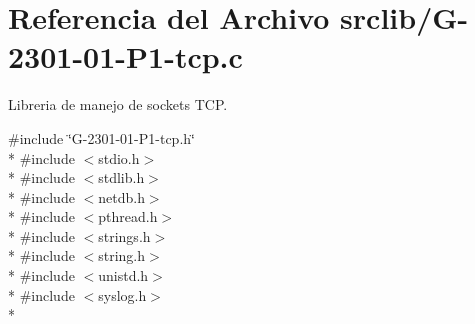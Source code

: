 \hypertarget{G-2301-01-P1-tcp_8c}{}\section{Referencia del Archivo srclib/\+G-\/2301-\/01-\/\+P1-\/tcp.c}
\label{G-2301-01-P1-tcp_8c}


Libreria de manejo de sockets T\+C\+P.  


{\ttfamily \#include \char`\"{}G-\/2301-\/01-\/\+P1-\/tcp.\+h\char`\"{}}\\*
{\ttfamily \#include $<$stdio.\+h$>$}\\*
{\ttfamily \#include $<$stdlib.\+h$>$}\\*
{\ttfamily \#include $<$netdb.\+h$>$}\\*
{\ttfamily \#include $<$pthread.\+h$>$}\\*
{\ttfamily \#include $<$strings.\+h$>$}\\*
{\ttfamily \#include $<$string.\+h$>$}\\*
{\ttfamily \#include $<$unistd.\+h$>$}\\*
{\ttfamily \#include $<$syslog.\+h$>$}\\*
